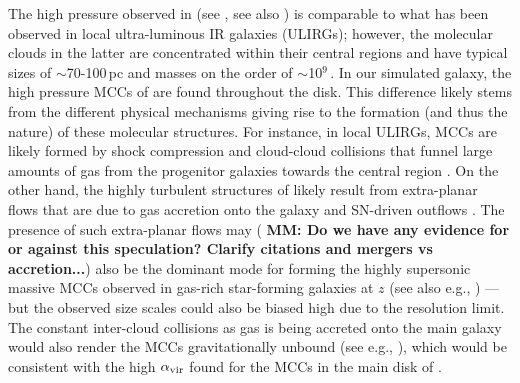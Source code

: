 \IfFileExists{emulateapjlegacy.cls}{\documentclass[iop]{emulateapjlegacy}}{\documentclass[iop]{emulateapj}}
\newcommand{\DL}[1]{({\bf \color{dlcolor} DL: #1})}
\newcommand{\MM}[1]{({\bf \color{mmcolor} MM: #1})}
\begin{document}
The high pressure observed in \flower (see , see also \citealt{Pallottini17a})
is comparable to what has been observed in local ultra-luminous IR galaxies (ULIRGs); however, the molecular clouds in the latter are concentrated within their central regions and have typical sizes of $\sim$70-100\,pc and masses on the order of $\sim$10$^9$\,\Msun \citep{Downes98a, Sakamoto08a}. In our simulated galaxy, the high pressure MCCs of \flower are found throughout the disk. This difference likely stems from the different physical mechanisms giving rise to the formation (and thus the nature) of these molecular structures.
%
For instance, in local ULIRGs, 
  MCCs are likely formed
by shock compression and cloud-cloud collisions 
    that funnel large amounts of gas from the progenitor galaxies
    towards the central region
\citep{Tan00a, Wu18a}.
On the other hand, the highly turbulent structures of \flower likely result from 
extra-planar flows that are due to gas accretion onto the galaxy and SN-driven outflows \citep{gallerani:2018,kohandel:2019}.
The presence of such extra-planar flows may \MM{Do we have any
  evidence for or against this speculation? Clarify citations and
  mergers vs accretion...} also be the 
dominant mode for forming the highly supersonic massive MCCs observed
in gas-rich star-forming galaxies at $z$ (see also e.g.,
\citealt{Swinbank11a}) --- but the observed size scales could also be biased 
high due to the resolution limit.
The constant inter-cloud collisions as gas is being accreted onto the
main galaxy 
would also render the MCCs gravitationally unbound (see e.g., \citealt{Dobbs11a}), 
which would be consistent with the high $\alpha_{\rm vir}$ found for the MCCs in the main disk of \flower.
\end{document}
